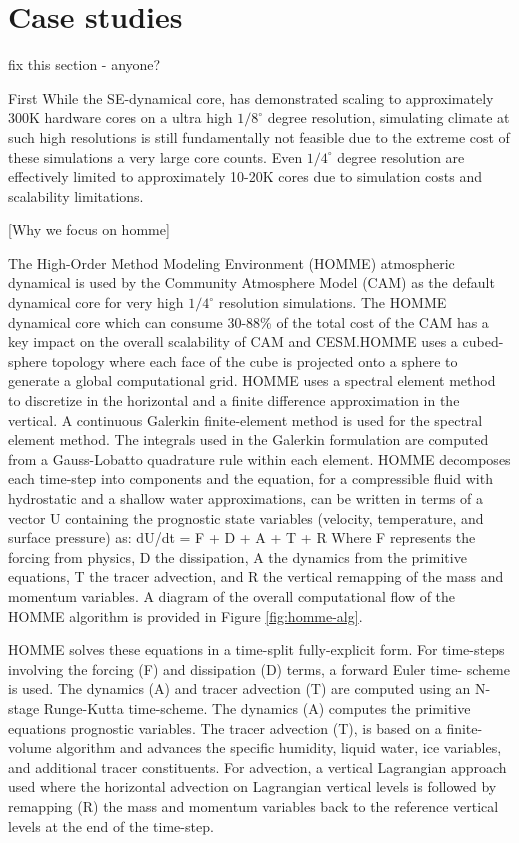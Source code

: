 
\section{Case studies}\label{sec:algorithm}
 {\color{red} fix this section - anyone?}

First
 While the SE-dynamical core, has demonstrated scaling to approximately 300K hardware cores \cite{came} on a ultra high $1/8^\circ$ degree resolution, simulating climate at such high resolutions is still fundamentally not feasible due to the extreme cost of these simulations a very large core counts.  Even $1/4^\circ$ degree resolution are effectively limited to approximately 10-20K cores due to simulation costs and scalability limitations.  


[Why we focus on homme]


The High-Order Method Modeling Environment (HOMME) atmospheric dynamical is used by the Community Atmosphere Model (CAM) as the default dynamical core for very high $1/4^\circ$ resolution simulations.   The HOMME dynamical core which can consume 30-88\% of the total cost of the CAM has a key impact on the overall scalability of CAM and CESM.HOMME uses a cubed-sphere topology where each face of the cube is projected onto a sphere to generate a global computational grid.  HOMME uses a spectral element method to discretize in the horizontal and a finite difference approximation \cite{simmons:1981} in the vertical. A continuous Galerkin finite-element method \cite{taylor:1997} is used for the spectral element method. The integrals used in the Galerkin formulation are computed from a Gauss-Lobatto quadrature rule within each element.  HOMME decomposes each time-step into components and the equation, for a compressible fluid with hydrostatic and a shallow water approximations, can be written in terms of a vector U containing the prognostic state variables (velocity, temperature, and surface pressure) as: 
dU/dt = F + D + A + T + R
Where F represents the forcing from physics, D the dissipation, A the dynamics from the primitive equations, T the tracer advection, and R the vertical remapping of the mass and momentum variables. A diagram of the overall computational flow of the HOMME algorithm is provided in Figure \ref{fig:homme-alg}. 

HOMME solves these equations in a time-split fully-explicit form. For time-steps involving the forcing (F) and dissipation (D) terms, a forward Euler time- scheme is used. The dynamics (A) and tracer advection (T) are computed using an N-stage Runge-Kutta time-scheme. The dynamics (A) computes the primitive equations prognostic variables. The tracer advection (T), is based on a finite-volume algorithm and advances the specific humidity, liquid water, ice variables, and additional tracer constituents. For advection, a vertical Lagrangian approach used \cite{lin:2004} where the horizontal advection on Lagrangian vertical levels is followed by remapping (R) the mass and momentum variables back to the reference vertical levels at the end of the time-step.

